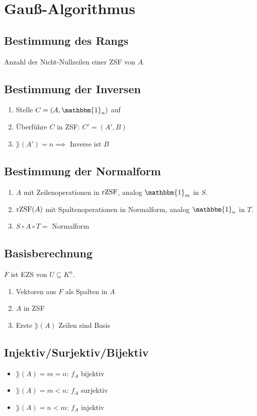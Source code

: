 \section*{Gauß-Algorithmus}

\subsection*{Bestimmung des Rangs}
Anzahl der Nicht-Nullzeilen einer ZSF von $A$.

\subsection*{Bestimmung der Inversen}
\begin{enumerate}
	\item Stelle $C = (A, \mathbbm{1}_n)$ auf
	\item Überführe $C$ in ZSF: $C'=(A',B)$
	\item $\rang(A')=n \implies $ Inverse ist $B$
\end{enumerate}

\subsection*{Bestimmung der Normalform}
\begin{enumerate}
	\item $A$ mit Zeilenoperationen in $\operatorname{rZSF}$,
		analog $\mathbbm{1}_m$ in $S$.
	\item $\operatorname{rZSF}(A)$ mit Spaltenoperationen in Normalform,
		analog $\mathbbm{1}_n$ in $T$.
	\item $S \circ A \circ T = $ Normalform
\end{enumerate}

\subsection*{Basisberechnung}
$F$ ist EZS von $U \subseteq K^n$.
\begin{enumerate}
	\item Vektoren aus $F$ als Spalten in $A$
	\item $A$ in ZSF
	\item Erste $\rang(A)$ Zeilen sind Basis
\end{enumerate}

\subsection*{Injektiv/Surjektiv/Bijektiv}
\begin{itemize}
	\item $\rang(A)=m=n$: $f_A$ bijektiv
	\item $\rang(A)=m<n$: $f_A$ surjektiv
	\item $\rang(A)=n<m$: $f_A$ injektiv
\end{itemize}

